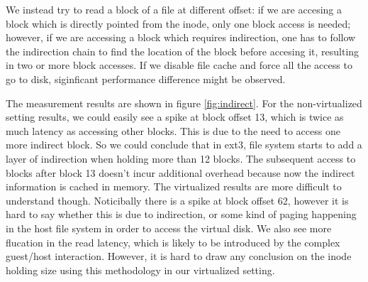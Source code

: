 We instead try to read a block of a file at different offset: if we are accesing a block which is directly pointed from the inode, only one block access is needed; however, if we are accessing a block which requires indirection, one has to follow the indirection chain to find the location of the block before accesing it, resulting in two or more block accesses. If we disable file cache and force all the access to go to disk, siginficant performance difference might be observed. 

The measurement results are shown in figure \ref{fig:indirect}. For the non-virtualized setting results, we could easily see a spike at block offset 13, which is twice as much latency as accessing other blocks. This is due to the need to access one more indirect block. So we could conclude that in ext3, file system starts to add a layer of indirection when holding more than 12 blocks. The subsequent access to blocks after block 13 doesn't incur additional overhead because now the indirect information is cached in memory. The virtualized results are more difficult to understand though. Noticibally there is a spike at block offset 62, however it is hard to say whether this is due to indirection, or some kind of paging happening in the host file system in order to access the virtual disk. We also see more flucation in the read latency, which is likely to be introduced by the complex guest/host interaction. However, it is hard to draw any conclusion on the inode holding size using this methodology in our virtualized setting. 
